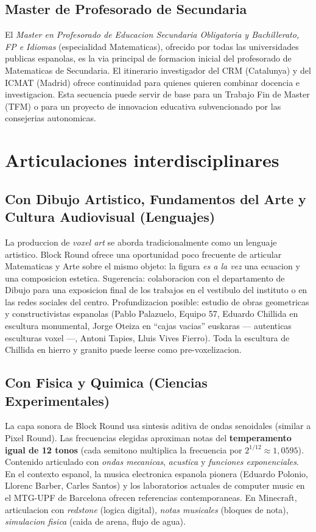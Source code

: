 \documentclass[12pt,a4paper]{scrartcl}
\newcommand{\acc}[1]{\textcolor{accent}{\textbf{#1}}}
\begin{document}
\subsection{Master de Profesorado de Secundaria}

El \emph{Master en Profesorado de Educacion Secundaria Obligatoria y Bachillerato, FP e Idiomas} (especialidad Matematicas), ofrecido por todas las universidades publicas espanolas, es la via principal de formacion inicial del profesorado de Matematicas de Secundaria. El itinerario investigador del CRM (Catalunya) y del ICMAT (Madrid) ofrece continuidad para quienes quieren combinar docencia e investigacion. Esta secuencia puede servir de base para un Trabajo Fin de Master (TFM) o para un proyecto de innovacion educativa subvencionado por las consejerias autonomicas.

\section{Articulaciones interdisciplinares}\label{sec:interdisc}

\subsection{Con Dibujo Artistico, Fundamentos del Arte y Cultura Audiovisual (Lenguajes)}
La produccion de \emph{voxel art} se aborda tradicionalmente como un lenguaje artistico. Block Round ofrece una oportunidad poco frecuente de articular Matematicas y Arte sobre el mismo objeto: la figura \emph{es a la vez} una ecuacion y una composicion estetica. Sugerencia: colaboracion con el departamento de Dibujo para una exposicion final de los trabajos en el vestibulo del instituto o en las redes sociales del centro. Profundizacion posible: estudio de obras geometricas y constructivistas espanolas (Pablo Palazuelo, Equipo 57, Eduardo Chillida en escultura monumental, Jorge Oteiza en \enquote{cajas vacias} euskaras --- autenticas esculturas voxel ---, Antoni Tapies, Lluis Vives Fierro). Toda la escultura de Chillida en hierro y granito puede leerse como pre-voxelizacion.

\subsection{Con Fisica y Quimica (Ciencias Experimentales)}
La capa sonora de Block Round usa sintesis aditiva de ondas senoidales (similar a Pixel Round). Las frecuencias elegidas aproximan notas del \acc{temperamento igual de 12 tonos} (cada semitono multiplica la frecuencia por $2^{1/12} \approx 1{,}0595$). Contenido articulado con \emph{ondas mecanicas}, \emph{acustica} y \emph{funciones exponenciales}. En el contexto espanol, la musica electronica espanola pionera (Eduardo Polonio, Llorenc Barber, Carles Santos) y los laboratorios actuales de computer music en el MTG-UPF de Barcelona ofrecen referencias contemporaneas. En Minecraft, articulacion con \emph{redstone} (logica digital), \emph{notas musicales} (bloques de nota), \emph{simulacion fisica} (caida de arena, flujo de agua).
\end{document}
